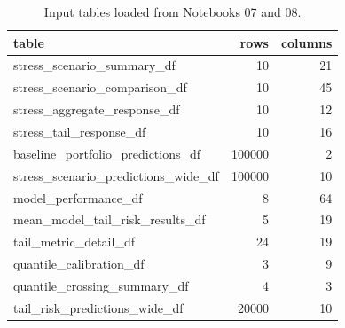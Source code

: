 \begin{table}
\caption{Input tables loaded from Notebooks 07 and 08.}
\label{tab:09-loaded-input-tables}
\begin{tabular}{lrr}
\toprule
table & rows & columns \\
\midrule
stress_scenario_summary_df & 10 & 21 \\
stress_scenario_comparison_df & 10 & 45 \\
stress_aggregate_response_df & 10 & 12 \\
stress_tail_response_df & 10 & 16 \\
baseline_portfolio_predictions_df & 100000 & 2 \\
stress_scenario_predictions_wide_df & 100000 & 10 \\
model_performance_df & 8 & 64 \\
mean_model_tail_risk_results_df & 5 & 19 \\
tail_metric_detail_df & 24 & 19 \\
quantile_calibration_df & 3 & 9 \\
quantile_crossing_summary_df & 4 & 3 \\
tail_risk_predictions_wide_df & 20000 & 10 \\
\bottomrule
\end{tabular}
\end{table}
